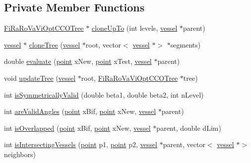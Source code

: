 \subsection*{Private Member Functions}
\begin{DoxyCompactItemize}
\item 
\mbox{\hyperlink{class_fi_ra_ro_va_vi_opt_c_c_o_tree}{Fi\+Ra\+Ro\+Va\+Vi\+Opt\+C\+C\+O\+Tree}} $\ast$ \mbox{\hyperlink{class_fi_ra_ro_va_vi_opt_c_c_o_tree_a86cd7106b4911517c645496456ba302f}{clone\+Up\+To}} (int levels, \mbox{\hyperlink{structvessel}{vessel}} $\ast$parent)
\item 
\mbox{\hyperlink{structvessel}{vessel}} $\ast$ \mbox{\hyperlink{class_fi_ra_ro_va_vi_opt_c_c_o_tree_a8a74a523182acf01b31f2a45d29263b2}{clone\+Tree}} (\mbox{\hyperlink{structvessel}{vessel}} $\ast$root, vector$<$ \mbox{\hyperlink{structvessel}{vessel}} $\ast$$>$ $\ast$segments)
\item 
double \mbox{\hyperlink{class_fi_ra_ro_va_vi_opt_c_c_o_tree_a5894cf89eef94422e4a1af49fc207b89}{evaluate}} (\mbox{\hyperlink{structpoint}{point}} x\+New, \mbox{\hyperlink{structpoint}{point}} x\+Test, \mbox{\hyperlink{structvessel}{vessel}} $\ast$parent)
\item 
void \mbox{\hyperlink{class_fi_ra_ro_va_vi_opt_c_c_o_tree_ac0905b566762939a0ea67a2fa0ae1133}{update\+Tree}} (\mbox{\hyperlink{structvessel}{vessel}} $\ast$root, \mbox{\hyperlink{class_fi_ra_ro_va_vi_opt_c_c_o_tree}{Fi\+Ra\+Ro\+Va\+Vi\+Opt\+C\+C\+O\+Tree}} $\ast$tree)
\item 
int \mbox{\hyperlink{class_fi_ra_ro_va_vi_opt_c_c_o_tree_a1f5fd9391dd301fd0f1734ecbed82780}{is\+Symmetrically\+Valid}} (double beta1, double beta2, int n\+Level)
\item 
int \mbox{\hyperlink{class_fi_ra_ro_va_vi_opt_c_c_o_tree_ab6d2f1242c1f39894465a989542c1e46}{are\+Valid\+Angles}} (\mbox{\hyperlink{structpoint}{point}} x\+Bif, \mbox{\hyperlink{structpoint}{point}} x\+New, \mbox{\hyperlink{structvessel}{vessel}} $\ast$parent)
\item 
int \mbox{\hyperlink{class_fi_ra_ro_va_vi_opt_c_c_o_tree_aa02a3445bfa0430e731cb2d265665be8}{is\+Overlapped}} (\mbox{\hyperlink{structpoint}{point}} x\+Bif, \mbox{\hyperlink{structpoint}{point}} x\+New, \mbox{\hyperlink{structvessel}{vessel}} $\ast$parent, double d\+Lim)
\item 
int \mbox{\hyperlink{class_fi_ra_ro_va_vi_opt_c_c_o_tree_a3f93dc6bfc79cf34af64c5ad6fb40a0a}{is\+Intersecting\+Vessels}} (\mbox{\hyperlink{structpoint}{point}} p1, \mbox{\hyperlink{structpoint}{point}} p2, \mbox{\hyperlink{structvessel}{vessel}} $\ast$parent, vector$<$ \mbox{\hyperlink{structvessel}{vessel}} $\ast$$>$ neighbors)

\end{DoxyCompactItemize}
